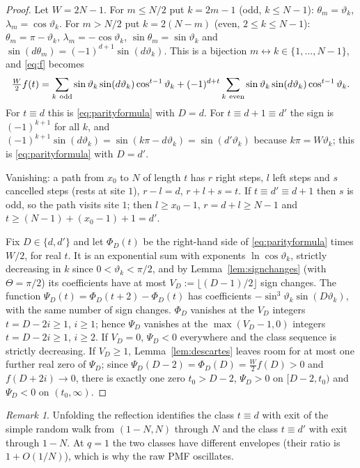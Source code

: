 \documentclass[11pt,a4paper]{article}
\theoremstyle{definition}
\theoremstyle{remark}
\newtheorem{remark}[theorem]{Remark}
\begin{document}
\begin{proof}
Let $W=2N-1$. For $m\le N/2$ put $k=2m-1$ (odd, $k\le N-1$): $\theta_m=\vartheta_k$, $\lambda_m=\cos\vartheta_k$.
For $m>N/2$ put $k=2(N-m)$ (even, $2\le k\le N-1$): $\theta_m=\pi-\vartheta_k$, $\lambda_m=-\cos\vartheta_k$,
$\sin\theta_m=\sin\vartheta_k$ and $\sin(d\theta_m)=(-1)^{d+1}\sin(d\vartheta_k)$. This is a bijection
$m\leftrightarrow k\in\{1,\dots,N-1\}$, and \eqref{eq:f} becomes
\[
  \tfrac W2f(t)=\sum_{k\ \rm odd}\sin\vartheta_k\sin(d\vartheta_k)\cos^{t-1}\vartheta_k
   +(-1)^{d+t}\sum_{k\ \rm even}\sin\vartheta_k\sin(d\vartheta_k)\cos^{t-1}\vartheta_k .
\]
For $t\equiv d$ this is \eqref{eq:parityformula} with $D=d$. For $t\equiv d+1\equiv d'$ the sign is
$(-1)^{k+1}$ for all $k$, and $(-1)^{k+1}\sin(d\vartheta_k)=\sin(k\pi-d\vartheta_k)=\sin(d'\vartheta_k)$ because
$k\pi=W\vartheta_k$; this is \eqref{eq:parityformula} with $D=d'$.

Vanishing: a path from $x_0$ to $N$ of length $t$ has $r$ right steps, $l$ left steps and $s$ cancelled steps
(rests at site $1$), $r-l=d$, $r+l+s=t$. If $t\equiv d'\equiv d+1$ then $s$ is odd, so the path visits
site $1$; then $l\ge x_0-1$, $r=d+l\ge N-1$ and $t\ge(N-1)+(x_0-1)+1=d'$.

Fix $D\in\{d,d'\}$ and let $\Phi_D(t)$ be the right-hand side of \eqref{eq:parityformula} times $W/2$, for
real $t$. It is an exponential sum with exponents $\ln\cos\vartheta_k$, strictly decreasing in $k$ since
$0<\vartheta_k<\pi/2$, and by Lemma~\ref{lem:signchanges} (with $\Theta=\pi/2$) its coefficients have at most
$V_D:=\lfloor(D-1)/2\rfloor$ sign changes. The function $\Psi_D(t)=\Phi_D(t+2)-\Phi_D(t)$ has coefficients
$-\sin^3\vartheta_k\sin(D\vartheta_k)$, with the same number of sign changes. $\Phi_D$ vanishes at the
$V_D$ integers $t=D-2i\ge1$, $i\ge1$; hence $\Psi_D$ vanishes at the $\max(V_D-1,0)$ integers $t=D-2i\ge1$,
$i\ge2$. If $V_D=0$, $\Psi_D<0$ everywhere and the class sequence is strictly decreasing. If $V_D\ge1$,
Lemma~\ref{lem:descartes} leaves room for at most one further real zero of $\Psi_D$; since
$\Psi_D(D-2)=\Phi_D(D)=\frac W2f(D)>0$ and $f(D+2i)\to0$, there is exactly one zero $t_0>D-2$,
$\Psi_D>0$ on $[D-2,t_0)$ and $\Psi_D<0$ on $(t_0,\infty)$.
\end{proof}

\begin{remark}
Unfolding the reflection identifies the class $t\equiv d$ with exit of the simple
random walk from $(1-N,N)$ through $N$ and the class $t\equiv d'$ with exit through $1-N$. At $q=1$ the two
classes have different envelopes (their ratio is $1+O(1/N)$), which is why the raw PMF oscillates.
\end{remark}
\end{document}

